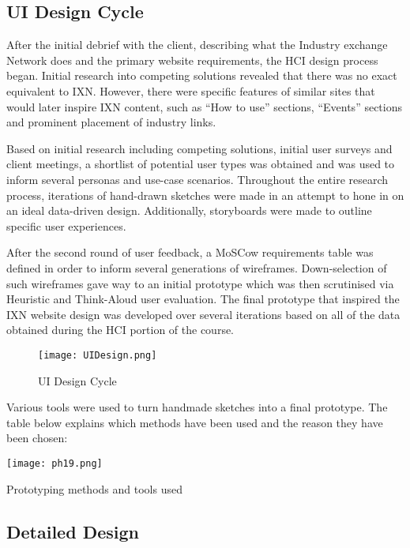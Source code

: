 \documentclass[fontsize=11pt]{extarticle}
\numberwithin{figure}{section} %
\begin{document}
\hypertarget{ui-design-cycle}{%
\subsection{UI Design Cycle}\label{ui-design-cycle}}

After the initial debrief with the client, describing what the Industry
exchange Network does and the primary website requirements, the HCI
design process began. Initial research into competing solutions revealed
that there was no exact equivalent to IXN. However, there were specific
features of similar sites that would later inspire IXN content, such as
``How to use'' sections, ``Events'' sections and prominent placement of
industry links.

Based on initial research including competing solutions, initial user
surveys and client meetings, a shortlist of potential user types was
obtained and was used to inform several personas and use-case scenarios.
Throughout the entire research process, iterations of hand-drawn
sketches were made in an attempt to hone in on an ideal data-driven
design. Additionally, storyboards were made to outline specific user
experiences.

After the second round of user feedback, a MoSCow requirements table was
defined in order to inform several generations of wireframes.
Down-selection of such wireframes gave way to an initial prototype which
was then scrutinised via Heuristic and Think-Aloud user evaluation. The
final prototype that inspired the IXN website design was developed over
several iterations based on all of the data obtained during the HCI
portion of the course.

\begin{figure}[H]
\centering
\texttt{[image: UIDesign.png]}
\caption{UI Design Cycle}
\label{UIDesign}
\end{figure}

Various tools were used to turn handmade sketches into a final
prototype. The table below explains which methods have been used and the
reason they have been chosen:

\begin{table}[H]
      \centering
      \texttt{[image: ph19.png]}
      \caption{Prototyping methods and tools used}
 \end{table}

\hypertarget{detailed-design}{%
\subsection{Detailed Design}\label{detailed-design}}
\end{document}
